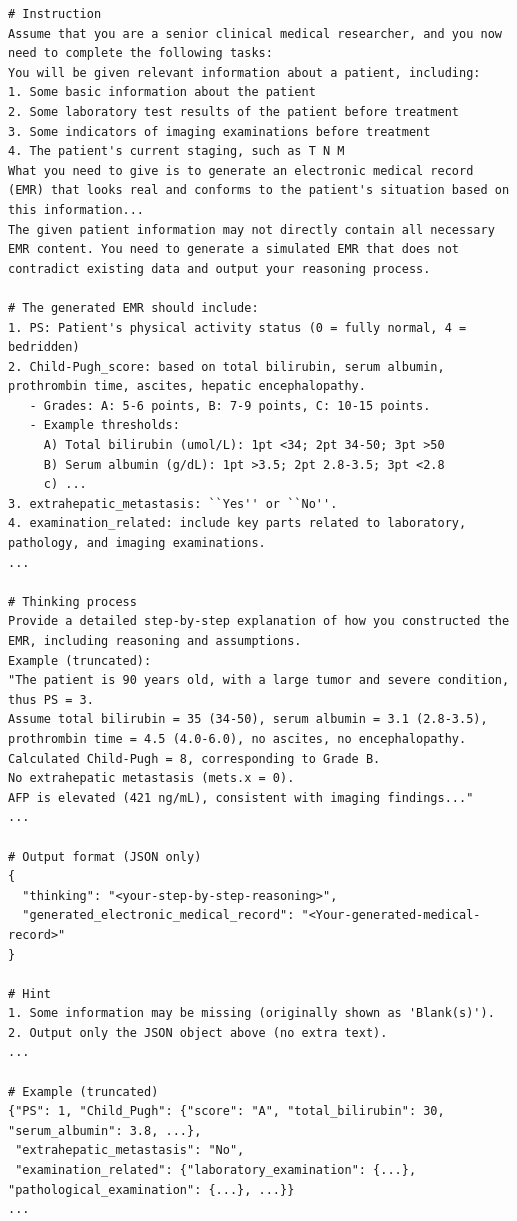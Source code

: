 \documentclass{article}
\begin{document}
\begin{appendices}
\begin{lstlisting}[style=promptmono,floatplacement=H,caption={EMR-generation prompt},label={lst:emr_gen_prompt}]
# Instruction
Assume that you are a senior clinical medical researcher, and you now need to complete the following tasks:
You will be given relevant information about a patient, including:
1. Some basic information about the patient
2. Some laboratory test results of the patient before treatment
3. Some indicators of imaging examinations before treatment
4. The patient's current staging, such as T N M
What you need to give is to generate an electronic medical record (EMR) that looks real and conforms to the patient's situation based on this information...
The given patient information may not directly contain all necessary EMR content. You need to generate a simulated EMR that does not contradict existing data and output your reasoning process.

# The generated EMR should include:
1. PS: Patient's physical activity status (0 = fully normal, 4 = bedridden)
2. Child-Pugh_score: based on total bilirubin, serum albumin, prothrombin time, ascites, hepatic encephalopathy.
   - Grades: A: 5-6 points, B: 7-9 points, C: 10-15 points.
   - Example thresholds:
     A) Total bilirubin (umol/L): 1pt <34; 2pt 34-50; 3pt >50
     B) Serum albumin (g/dL): 1pt >3.5; 2pt 2.8-3.5; 3pt <2.8
     c) ...
3. extrahepatic_metastasis: ``Yes'' or ``No''.
4. examination_related: include key parts related to laboratory, pathology, and imaging examinations.
...

# Thinking process
Provide a detailed step-by-step explanation of how you constructed the EMR, including reasoning and assumptions.
Example (truncated):
"The patient is 90 years old, with a large tumor and severe condition, thus PS = 3.
Assume total bilirubin = 35 (34-50), serum albumin = 3.1 (2.8-3.5),
prothrombin time = 4.5 (4.0-6.0), no ascites, no encephalopathy.
Calculated Child-Pugh = 8, corresponding to Grade B.
No extrahepatic metastasis (mets.x = 0).
AFP is elevated (421 ng/mL), consistent with imaging findings..."
...

# Output format (JSON only)
{
  "thinking": "<your-step-by-step-reasoning>",
  "generated_electronic_medical_record": "<Your-generated-medical-record>"
}

# Hint
1. Some information may be missing (originally shown as 'Blank(s)').
2. Output only the JSON object above (no extra text).
...

# Example (truncated)
{"PS": 1, "Child_Pugh": {"score": "A", "total_bilirubin": 30, "serum_albumin": 3.8, ...},
 "extrahepatic_metastasis": "No",
 "examination_related": {"laboratory_examination": {...}, "pathological_examination": {...}, ...}}
...
\end{lstlisting}




\end{appendices}
\end{document}
